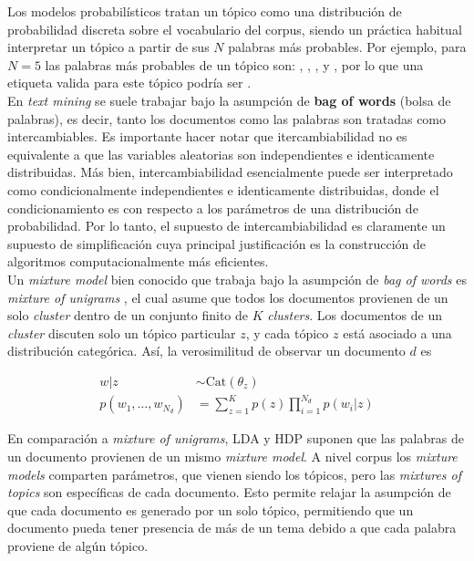 \documentclass[letterpaper,12pt,oneside]{book} %
\begin{document}
Los modelos probabilísticos tratan un tópico como una distribución de probabilidad discreta sobre el vocabulario del corpus, siendo un práctica habitual interpretar un tópico a partir de sus $N$ palabras más probables. Por ejemplo, para $N=5$ las palabras más probables de un tópico son: , , ,  y , por lo que una etiqueta valida para este tópico podría ser .\\ 

En \textit{text mining} se suele trabajar bajo la asumpción de \textbf{bag of words} (bolsa de palabras), es decir, tanto los documentos como las palabras son tratadas como intercambiables. Es importante hacer notar que itercambiabilidad no es equivalente a que las variables aleatorias son independientes e identicamente distribuidas. Más bien, intercambiabilidad esencialmente puede ser interpretado como condicionalmente independientes e identicamente distribuidas, donde el condicionamiento es con respecto a los parámetros de una distribución de probabilidad. Por lo tanto, el supuesto de intercambiabilidad es claramente un supuesto de simplificación cuya principal justificación es la construcción de algoritmos computacionalmente más eficientes.\\

Un \textit{mixture model} bien conocido que trabaja bajo la asumpción de \textit{bag of words} es \textit{mixture of unigrams} \citep{nigam2000text}, el cual asume que todos los documentos provienen de un solo \textit{cluster} dentro de un conjunto finito de $K$ \textit{clusters}. Los documentos de un \textit{cluster} discuten solo un tópico particular $z$, y cada tópico $z$ está asociado a una distribución categórica. Así, la verosimilitud de observar un documento $d$ es

\begin{align}
    w|z &\sim \text{Cat}(\theta_{z})\\
    p(w_{1}, \ldots, w_{N_{d}}) &= \sum_{z=1}^{K}p(z)\prod_{i=1}^{N_{d}}p(w_{i}|z)
\end{align}

En comparación a \textit{mixture of unigrams}, LDA y HDP suponen que las palabras de un documento provienen de un mismo \textit{mixture model}. A nivel corpus los \textit{mixture models} comparten parámetros, que vienen siendo los tópicos, pero las \textit{mixtures of topics} son específicas de cada documento. Esto permite relajar la asumpción de que cada documento es generado por un solo tópico, permitiendo que un documento pueda tener presencia de más de un tema debido a que cada palabra proviene de algún tópico.\\
\end{document}
